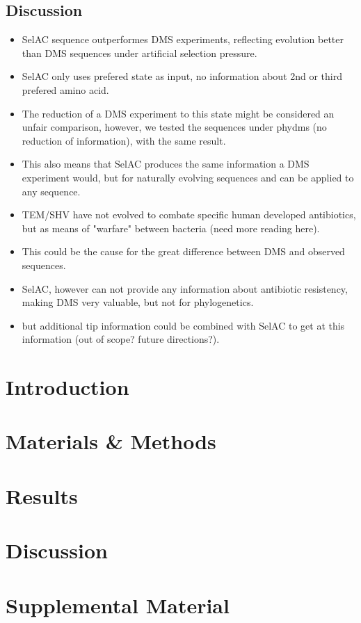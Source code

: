 \documentclass[12pt]{article}
\begin{document}
\subsection*{Discussion}
\begin{itemize}
	\item SelAC sequence outperformes DMS experiments, reflecting evolution better than DMS sequences under artificial selection pressure.
	\item SelAC only uses prefered state as input, no information about 2nd or third prefered amino acid.
	\item The reduction of a DMS experiment to this state might be considered an unfair comparison, however, we tested the sequences under phydms (no reduction of information), with the same result.
	\item This also means that SelAC produces the same information a DMS experiment would, but for naturally evolving sequences and can be applied to any sequence.
	\item TEM/SHV have not evolved to combate specific human developed antibiotics, but as means of "warfare" between bacteria (need more reading here).
	\item This could be the cause for the great difference between DMS and observed sequences.
	\item SelAC, however can not provide any information about antibiotic resistency, making DMS very valuable, but not for phylogenetics. 
	\item but additional tip information could be combined with SelAC to get at this information (out of scope? future directions?).
\end{itemize}

\section*{Introduction}
\section*{Materials \& Methods}	
\section*{Results}
\section*{Discussion}

\section*{Supplemental Material}
\end{document}
